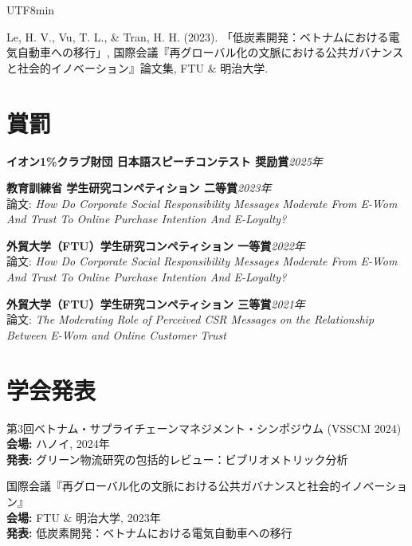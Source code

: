 \documentclass[10.5pt]{article}
\begin{document}
\begin{CJK}{UTF8}{min}
\begin{enumerate}[label={[\arabic*]}]
\item Le, H. V., Vu, T. L., \& Tran, H. H. (2023). 「低炭素開発：ベトナムにおける電気自動車への移行」, 国際会議『再グローバル化の文脈における公共ガバナンスと社会的イノベーション』論文集, FTU \& 明治大学.

\end{enumerate}


\section{賞罰}

\textbf{イオン1\%クラブ財団 日本語スピーチコンテスト 奨励賞}\hfill \emph{2025年}

\textbf{教育訓練省 学生研究コンペティション 二等賞}\hfill \emph{2023年}\\
論文: \textit{How Do Corporate Social Responsibility Messages Moderate From E-Wom And Trust To Online Purchase Intention And E-Loyalty?}

\textbf{外貿大学（FTU）学生研究コンペティション 一等賞}\hfill \emph{2022年}\\
論文: \textit{How Do Corporate Social Responsibility Messages Moderate From E-Wom And Trust To Online Purchase Intention And E-Loyalty?}

\textbf{外貿大学（FTU）学生研究コンペティション 三等賞}\hfill \emph{2021年}\\
論文: \textit{The Moderating Role of Perceived CSR Messages on the Relationship Between E-Wom and Online Customer Trust}


\section{学会発表}

\begin{enumerate}[label={[\arabic*]}]
\item 第3回ベトナム・サプライチェーンマネジメント・シンポジウム (VSSCM 2024) \\
	\textbf{会場:} ハノイ, 2024年 \\
	\textbf{発表:} グリーン物流研究の包括的レビュー：ビブリオメトリック分析
\item 国際会議『再グローバル化の文脈における公共ガバナンスと社会的イノベーション』 \\
	\textbf{会場:} FTU \& 明治大学, 2023年 \\
	\textbf{発表:} 低炭素開発：ベトナムにおける電気自動車への移行
\end{enumerate}


\end{CJK}
\end{document}

